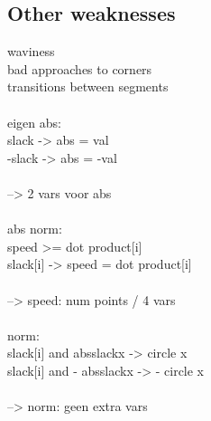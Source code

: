 \subsection{Other weaknesses}
waviness\\
bad approaches to corners\\
transitions between segments\\\\

eigen abs:\\
slack -> abs = val\\
-slack -> abs = -val\\\\

--> 2 vars voor abs\\\\

abs norm:\\
speed >= dot product[i]\\
slack[i] -> speed = dot product[i]\\\\

--> speed: num points / 4 vars\\\\

norm:\\
slack[i] and absslackx -> circle x\\
slack[i] and - absslackx -> - circle x\\\\

--> norm: geen extra vars   \\